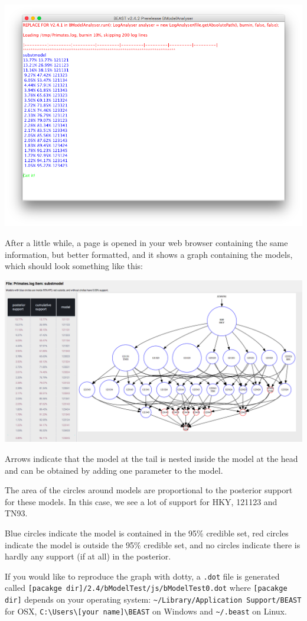 \documentclass{article}
\begin{document}
\includegraphics[width=\textwidth]{bModelTest0}

After a little while, a page is opened in your web browser containing the same information, but better formatted, and it shows a graph containing the models, which should look something like this:

\includegraphics[width=\textwidth]{bModelTest}

Arrows indicate that the model at the tail is nested inside the model at the head and can be obtained by adding one parameter to the model.

The area of the circles around models are proportional to the posterior support for these models. In this case, we see a lot of support for HKY, 121123 and TN93.

Blue circles indicate the model is contained in the 95\% credible set, red circles indicate the model is outside the 95\% credible set, and no circles indicate there is hardly any support (if at all) in the posterior.

If you would like to reproduce the graph with dotty, a {\tt .dot} file is generated called {\tt[pacakge dir]/2.4/bModelTest/js/bModelTest0.dot} where {\tt [pacakge dir]} depends on your operating system: 
{\tt \textasciitilde/Library/Application Support/BEAST} for OSX, {\tt C:\textbackslash Users\textbackslash}{\tt[your name]\textbackslash BEAST} on Windows and {\tt \textasciitilde/.beast} on Linux.



\end{document}
